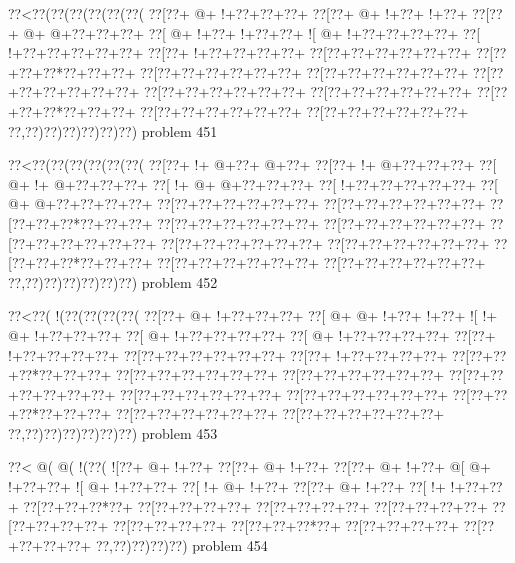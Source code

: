 \vbox{\vbox{\goo
\0??<\0??(\0??(\0??(\0??(\0??(\0??(
\0??[\0??+\- @+\- !+\0??+\0??+\0??+
\0??[\0??+\- @+\- !+\0??+\- !+\0??+
\0??[\0??+\- @+\- @+\0??+\0??+\0??+
\0??[\- @+\- !+\0??+\- !+\0??+\0??+
\- ![\- @+\- !+\0??+\0??+\0??+\0??+
\0??[\- !+\0??+\0??+\0??+\0??+\0??+
\0??[\0??+\- !+\0??+\0??+\0??+\0??+
\0??[\0??+\0??+\0??+\0??+\0??+\0??+
\0??[\0??+\0??+\0??*\0??+\0??+\0??+
\0??[\0??+\0??+\0??+\0??+\0??+\0??+
\0??[\0??+\0??+\0??+\0??+\0??+\0??+
\0??[\0??+\0??+\0??+\0??+\0??+\0??+
\0??[\0??+\0??+\0??+\0??+\0??+\0??+
\0??[\0??+\0??+\0??+\0??+\0??+\0??+
\0??[\0??+\0??+\0??*\0??+\0??+\0??+
\0??[\0??+\0??+\0??+\0??+\0??+\0??+
\0??[\0??+\0??+\0??+\0??+\0??+\0??+
\0??,\0??)\0??)\0??)\0??)\0??)\0??)
}
\hfil problem 451\hfil\break
}

\vbox{\vbox{\goo
\0??<\0??(\0??(\0??(\0??(\0??(\0??(
\0??[\0??+\- !+\- @+\0??+\- @+\0??+
\0??[\0??+\- !+\- @+\0??+\0??+\0??+
\0??[\- @+\- !+\- @+\0??+\0??+\0??+
\0??[\- !+\- @+\- @+\0??+\0??+\0??+
\0??[\- !+\0??+\0??+\0??+\0??+\0??+
\0??[\- @+\- @+\0??+\0??+\0??+\0??+
\0??[\0??+\0??+\0??+\0??+\0??+\0??+
\0??[\0??+\0??+\0??+\0??+\0??+\0??+
\0??[\0??+\0??+\0??*\0??+\0??+\0??+
\0??[\0??+\0??+\0??+\0??+\0??+\0??+
\0??[\0??+\0??+\0??+\0??+\0??+\0??+
\0??[\0??+\0??+\0??+\0??+\0??+\0??+
\0??[\0??+\0??+\0??+\0??+\0??+\0??+
\0??[\0??+\0??+\0??+\0??+\0??+\0??+
\0??[\0??+\0??+\0??*\0??+\0??+\0??+
\0??[\0??+\0??+\0??+\0??+\0??+\0??+
\0??[\0??+\0??+\0??+\0??+\0??+\0??+
\0??,\0??)\0??)\0??)\0??)\0??)\0??)
}
\hfil problem 452\hfil\break
}

\vbox{\vbox{\goo
\0??<\0??(\- !(\0??(\0??(\0??(\0??(
\0??[\0??+\- @+\- !+\0??+\0??+\0??+
\0??[\- @+\- @+\- !+\0??+\- !+\0??+
\- ![\- !+\- @+\- !+\0??+\0??+\0??+
\0??[\- @+\- !+\0??+\0??+\0??+\0??+
\0??[\- @+\- !+\0??+\0??+\0??+\0??+
\0??[\0??+\- !+\0??+\0??+\0??+\0??+
\0??[\0??+\0??+\0??+\0??+\0??+\0??+
\0??[\0??+\- !+\0??+\0??+\0??+\0??+
\0??[\0??+\0??+\0??*\0??+\0??+\0??+
\0??[\0??+\0??+\0??+\0??+\0??+\0??+
\0??[\0??+\0??+\0??+\0??+\0??+\0??+
\0??[\0??+\0??+\0??+\0??+\0??+\0??+
\0??[\0??+\0??+\0??+\0??+\0??+\0??+
\0??[\0??+\0??+\0??+\0??+\0??+\0??+
\0??[\0??+\0??+\0??*\0??+\0??+\0??+
\0??[\0??+\0??+\0??+\0??+\0??+\0??+
\0??[\0??+\0??+\0??+\0??+\0??+\0??+
\0??,\0??)\0??)\0??)\0??)\0??)\0??)
}
\hfil problem 453\hfil\break
}

\vbox{\vbox{\goo
\0??<\- @(\- @(\- !(\0??(
\- ![\0??+\- @+\- !+\0??+
\0??[\0??+\- @+\- !+\0??+
\0??[\0??+\- @+\- !+\0??+
\- @[\- @+\- !+\0??+\0??+
\- ![\- @+\- !+\0??+\0??+
\0??[\- !+\- @+\- !+\0??+
\0??[\0??+\- @+\- !+\0??+
\0??[\- !+\- !+\0??+\0??+
\0??[\0??+\0??+\0??*\0??+
\0??[\0??+\0??+\0??+\0??+
\0??[\0??+\0??+\0??+\0??+
\0??[\0??+\0??+\0??+\0??+
\0??[\0??+\0??+\0??+\0??+
\0??[\0??+\0??+\0??+\0??+
\0??[\0??+\0??+\0??*\0??+
\0??[\0??+\0??+\0??+\0??+
\0??[\0??+\0??+\0??+\0??+
\0??,\0??)\0??)\0??)\0??)
}
\hfil problem 454\hfil\break
}

